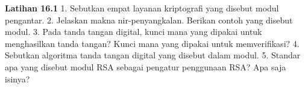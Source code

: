 \begin{obereflection}
\textbf{Latihan 16.1}
1. Sebutkan empat layanan kriptografi yang disebut modul pengantar.
2. Jelaskan makna nir-penyangkalan. Berikan contoh yang disebut modul.
3. Pada tanda tangan digital, kunci mana yang dipakai untuk menghasilkan tanda
   tangan? Kunci mana yang dipakai untuk memverifikasi?
4. Sebutkan algoritma tanda tangan digital yang disebut dalam modul.
5. Standar apa yang disebut modul RSA sebagai pengatur penggunaan RSA? Apa saja
   isinya?
\end{obereflection}
